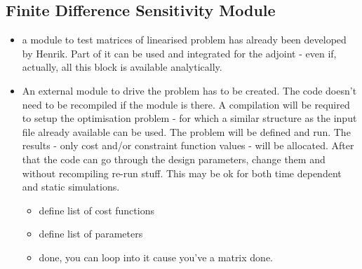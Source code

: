 \documentclass[a4paper,10pt]{article}
\newcommand{\bit}{\begin{itemize}}
\newcommand{\eit}{\end{itemize}}
\begin{document}
\subsection{Finite Difference Sensitivity Module}
\bit
\item a module to test matrices of linearised problem has already been developed by Henrik. Part of it can be used and integrated for the adjoint - even if, actually, all this block is available analytically.
\item An external module to drive the problem has to be created. The code doesn't need to be recompiled if the module is there. A compilation will be required to setup the optimisation problem - for which a similar structure as the input file already available can be used. The problem will be defined and run. The results - only cost and/or constraint function values - will be allocated. After that the code can go through the design parameters, change them and without recompiling re-run stuff. This may be ok for both time dependent and static simulations.
	\bit
	\item define list of cost functions
	\item define list of parameters
	\item done, you can loop into it cause you've a matrix done.
	\eit
\eit
\end{document}
